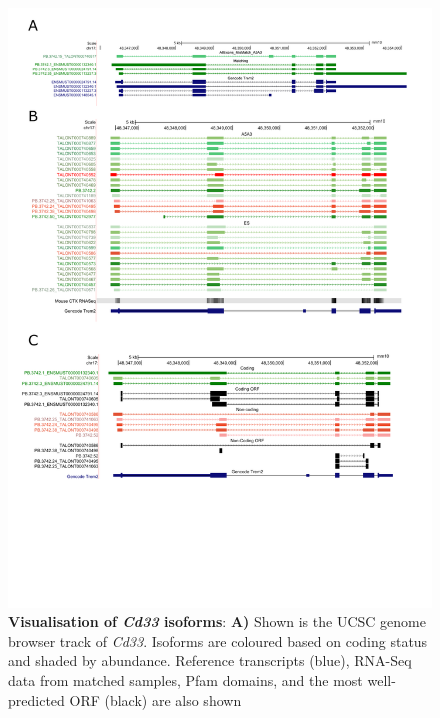 \begin{landscape}
	\begin{figure}[htp]
		\begin{center}
			\includegraphics[page=9,trim={0 13cm 0 0},scale = 0.85]{Figures/pdfjoiner.pdf}
		\end{center}
		\captionsetup{width=1.5\textwidth}
		\caption[Visualisation of \textit{Cd33} isoforms]%
		{\textbf{Visualisation of \textit{Cd33} isoforms}: \textbf{A)} Shown is the UCSC genome browser track of \textit{Cd33}. Isoforms are coloured based on coding status and shaded by abundance. Reference transcripts (blue), RNA-Seq data from matched samples, Pfam domains, and the most well-predicted ORF (black) are also shown}   
		\label{fig:cd33_track}
	\end{figure}
\end{landscape}

